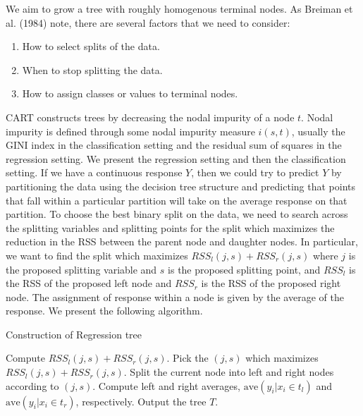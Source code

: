 \documentclass[12pt,twoside]{reedthesis}
\theoremstyle{definition}
\theoremstyle{definition}
\theoremstyle{definition}
\theoremstyle{remark}
\begin{document}
We aim to grow a tree with roughly homogenous terminal nodes. As Breiman
et al. (1984) note, there are several factors that we need to consider:
\begin{enumerate}
        \item How to select splits of the data.
        
        \item When to stop splitting the data.
        
        \item How to assign classes or values to terminal nodes. 
    \end{enumerate}
CART constructs trees by decreasing the nodal impurity of a node \(t\).
Nodal impurity is defined through some nodal impurity measure
\(i(s,t)\), usually the GINI index in the classification setting and the
residual sum of squares in the regression setting. We present the
regression setting and then the classification setting. If we have a
continuous response \(Y\), then we could try to predict \(Y\) by
partitioning the data using the decision tree structure and predicting
that points that fall within a particular partition will take on the
average response on that partition. To choose the best binary split on
the data, we need to search across the splitting variables and splitting
points for the split which maximizes the reduction in the RSS between
the parent node and daughter nodes. In particular, we want to find the
split which maximizes \(RSS_l(j,s)+RSS_r(j,s)\) where \(j\) is the
proposed splitting variable and \(s\) is the proposed splitting point,
and \(RSS_l\) is the RSS of the proposed left node and \(RSS_r\) is the
RSS of the proposed right node. The assignment of response within a node
is given by the average of the response. We present the following
algorithm.
\begin{algorithm}
        \caption{Construction of Regression tree}\label{regression tree}
        \begin{algorithmic}[1]
                    \State Compute $RSS_l(j,s)+RSS_r(j,s)$.
                    \EndFor
                    \State Pick the $(j,s)$ which maximizes $RSS_l(j,s)+RSS_r(j,s)$.
                    \State Split the current node into left and right nodes according to $(j,s)$.
                    \State Compute left and right averages, $\text{ave}(y_i|x_i\in t_l)$ and $\text{ave}(y_i|x_i\in t_r)$, respectively. 
                \EndFor
                \State Output the tree $T$.
            \EndWhile
        \end{algorithmic}
    \end{algorithm}
\end{document}
